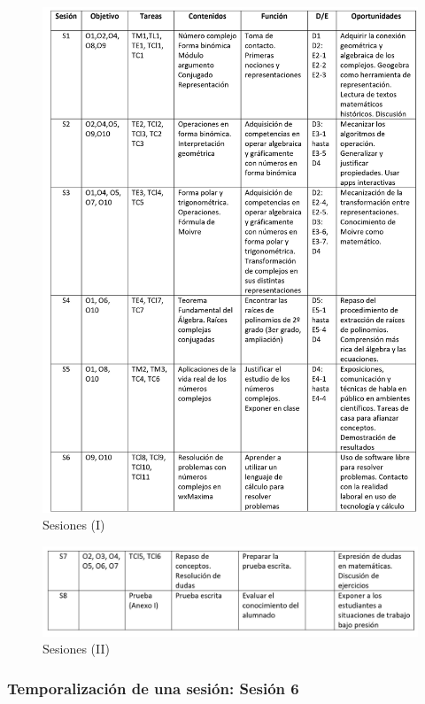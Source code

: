 \documentclass[../main.tex]{memoir}
\begin{document}
\begin{figure}[H]

	\includegraphics[scale=0.8]{images/0001.jpg}
	\caption{Sesiones (I)}
	\label{sesiones1}
\end{figure}

\begin{figure}[H]
	
	\includegraphics[scale=0.8]{images/0002.jpg}
	\caption{Sesiones (II)}
	\label{sesiones2}
\end{figure}


\subsubsection{Temporalización de una sesión: Sesión 6}
\end{document}
